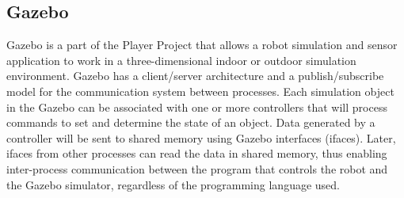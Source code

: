\subsection{Gazebo}
\label{subsec:gazebo}

Gazebo \citep{koenig2004} is a part of the Player Project \citep{gerkey2003} that allows a robot simulation and sensor application to work in a three-dimensional indoor or outdoor simulation environment.
Gazebo has a client/server architecture and a publish/subscribe model for the communication system between processes.
Each simulation object in the Gazebo can be associated with one or more controllers that will process commands to set and determine the state of an object.
Data generated by a controller will be sent to shared memory using Gazebo interfaces (ifaces).
Later, ifaces from other processes can read the data in shared memory,
  thus enabling inter-process communication between the program that controls the robot and the Gazebo simulator,
  regardless of the programming language used.
